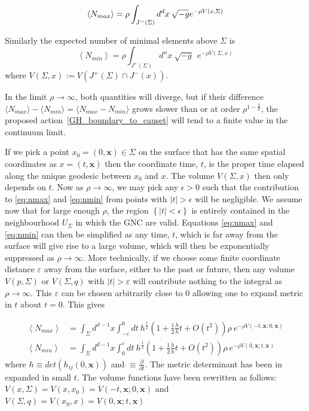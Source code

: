 \documentclass[12pt]{article}
\newcommand{\be}{\begin{equation}}
\newcommand{\ee}{\end{equation}}
\begin{document}
\be\label{eq:nmax}
\left\langle N_{max}\right\rangle =\rho\int_{J^{-}(\Sigma)}d^{d}x\:\sqrt{-g}\\ e^{-\rho V(x,\Sigma)}
\ee

Similarly the expected number of minimal elements above $\Sigma$ is
\be\label{eq:nmin}
\left\langle N_{min}\right\rangle =\rho\int_{J^{+}(\Sigma)}d^{n}x\:\sqrt{-g}\ \ e^{-\rho V(\Sigma,x)}
\ee
where $V(\Sigma,x):=V(J^{+}(\Sigma)\cap J^{-}(x))$.

In the limit $\rho\rightarrow\infty$, both quantities will diverge, but if their difference $\langle N_{max}\rangle - \langle N_{min}\rangle = \langle N_{max} - N_{min}\rangle$ grows slower than or at order $\rho^{1-\frac2d}$, the proposed action~\eqref{GH_boundary_to_causet} will tend to a finite value in the continuum limit.

If we pick a point $x_0=(0,\mathbf{x})\in \Sigma$ on the surface that has the same spatial coordinates as $x=(t,\mathbf{x})$ then the coordinate time, $t$, is the proper time elapsed along the unique geodesic between $x_0$ and $x$. The volume $V(\Sigma,x)$ then only depends on $t$. Now as $\rho\rightarrow\infty$, we may pick any $\epsilon>0$ such that the contribution to \eqref{eq:nmax} and \eqref{eq:nmin} from points with $|t|>\epsilon$ will be negligible. We assume now that for large enough $\rho$, the region $\left\{|t|<\epsilon\right\}$ is entirely contained in the neighbourhood $U_\Sigma$ in which the GNC are valid.
Equations \eqref{eq:nmax} and \eqref{eq:nmin} can then be simplified as any time, $t$, which is far away from the surface will give rise to a large volume, which will then be exponentially suppressed as $\rho \rightarrow \infty$. More technically, if we choose some finite coordinate distance $\varepsilon$ away from the surface, either to the past or future, then any volume $V(p,\Sigma)$ or $V(\Sigma,q)$ with $|t|>\varepsilon$ will contribute nothing to the integral as $\rho \rightarrow \infty$. This $\varepsilon$ can be chosen arbitrarily close to $0$ allowing one to expand metric in $t$ about $t=0$. This gives

\begin{align}\label{eq:nmax_and_eq:nmin}
\left\langle N_{max}\right\rangle & =\int_{\Sigma}d^{d-1}x\int_{-\varepsilon}^{0}dt\:
h^{\frac{1}{2}}\left(1+
\frac{1}{2}\frac{\dot{h}}{h}t+O(t^2)\right)
 \rho\ e^{-\rho V(-t,\mathbf{x};0,\mathbf{x})}
\\
\left\langle N_{min}\right\rangle & =\int_{\Sigma}d^{d-1}x\int_{0}^{\varepsilon}dt\:
h^{\frac{1}{2}}\left(1+
\frac{1}{2}\frac{\dot{h}}{h}t+O(t^2)\right) \rho\ e^{-\rho V(0,\mathbf{x};t,\mathbf{x})}
\end{align}
where $h\equiv det\left(h_{ij}(0,\mathbf{x})\right)$ and $\dot{}\equiv \frac{\partial}{\partial t}$. The metric determinant has been in expanded in small $t$. The volume functions have been rewritten as follows: $V(x,\Sigma)=V(x,x_0)=V(-t,\mathbf{x};0,\mathbf{x})$ and $V(\Sigma,q)=V(x_0,x)=V(0,\mathbf{x};t,\mathbf{x})$
\end{document}
